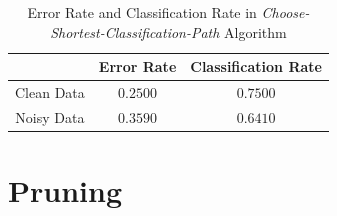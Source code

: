 \documentclass[11pt,a4paper]{article}
\begin{document}
\begin{table}[!ht]
\centering
\begin{tabular}{|c|c|c|}
\hline 
 & \textbf{Error Rate} & \textbf{Classification Rate} \\ 
\hline 
Clean Data & $0.2500$ & $0.7500$ \\ 
\hline 
Noisy Data & $0.3590$ & $0.6410$ \\ 
\hline 
\end{tabular} 
\caption{Error Rate and Classification Rate in \emph{Choose-Shortest-Classification-Path} Algorithm}
\label{tab:chooseDepthRates}
\end{table}

\section{Pruning}
\end{document}

